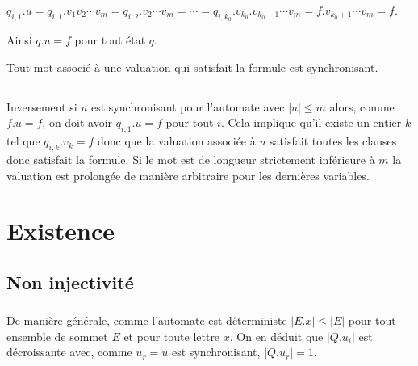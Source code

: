 $q_{i,1}.u = q_{i,1}.v_1v_2\cdots v_m= q_{i,2}.v_2\cdots v_m=
\cdots = q_{i,k_0}.v_{k_0}.v_{k_0+1}\cdots v_m = f.v_{k_0+1}\cdots v_m=f$.

Ainsi $q.u=f$ pour tout état $q$.

Tout mot associé à une valuation qui satisfait la formule est synchronisant.
\subsection{}
Inversement si $u$ est synchronisant pour l'automate avec $|u|\le m$ alors, comme $f.u=f$, on doit avoir $q_{i,1}.u = f$ pour tout $i$. Cela implique qu'il existe un entier $k$ tel que $q_{i,k}.v_k = f$ donc que la valuation associée à $u$ satisfait toutes les clauses donc satisfait la formule. Si le mot est de longueur strictement inférieure à $m$ la valuation est prolongée de manière arbitraire pour les dernières variables.
\section{Existence}
\subsection{Non injectivité}
\subsubsection{}
De manière générale, comme l'automate est déterministe $|E.x| \le |E|$ pour tout ensemble de sommet $E$ et pour toute lettre $x$. On en déduit que $|Q.u_i|$ est décroissante avec, comme $u_r=u$ est synchronisant, $|Q.u_r|=1$.

